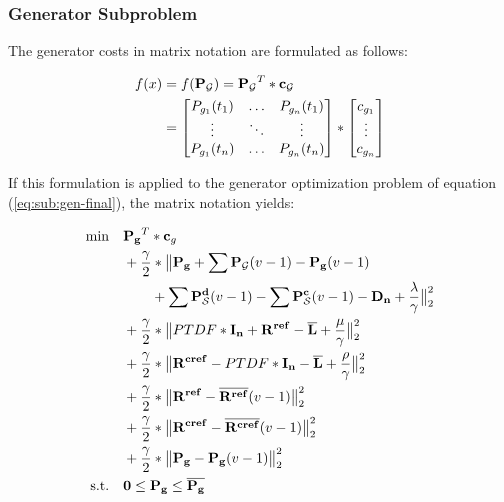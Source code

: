 \subsubsection*{Generator Subproblem}

The generator costs in matrix notation are formulated as follows:

\begin{subequations}
	\begin{align}
		f(x) &= f(\vb{P_\mathcal{G}}) = \vb{P_\mathcal{G}}^T * \vb{c_\mathcal{G}}\\
		& = \begin{bmatrix}
			P_{g_1}(t_1) & \dots & P_{g_n}(t_1) \\
			\vdots & \ddots & \vdots \\
			P_{g_1}(t_n) & \dots & P_{g_n}(t_n)
		\end{bmatrix} * \begin{bmatrix}
			c_{g_1} \\
			\vdots \\
			c_{g_n}
		\end{bmatrix}
	\end{align}
\end{subequations}

If this formulation is applied to the generator optimization problem of equation (\ref{eq:sub:gen-final}), the matrix notation yields:

 \begin{subequations}
	\begin{align}
		 \min \quad & \vb{P_g}^T * \vb{c}_g \\
		 & + \frac{\gamma}{2} * \big\| \vb{P_g} + \sum \vb{P_\mathcal{G}}(v-1) - \vb{P_g}(v-1) \nonumber \\
		 & \qquad + \sum \vb{P_\mathcal{S}^d}(v-1) - \sum \vb{P_\mathcal{S}^c}(v-1) - \vb{D_n} + \frac{\vb{\lambda}}{\gamma} \big\|^2_2 \label{eq:dom-matrix:eb} \\
		 & + \frac{\gamma}{2} * \big\| PTDF * \vb{I_n} + \vb{R^{ref}} - \vb{\overline{L}} + \frac{\vb{\mu}}{\gamma}\big\|^2_2 \nonumber \\
		 & + \frac{\gamma}{2} * \big\| \vb{R^{cref}} - PTDF * \vb{I_n} - \vb{\overline{L}} + \frac{\vb{\rho}}{\gamma}\big\|^2_2 \nonumber \\
		 & + \frac{\gamma}{2} * \big\| \vb{R^{ref}} - \vb{\overline{R^{ref}}}(v-1)  \big\|^2_2 \nonumber\\
		 & + \frac{\gamma}{2} * \big\| \vb{R^{cref}} - \vb{\overline{R^{cref}}}(v-1) \big\|^2_2 \nonumber \\
		 & + \frac{\gamma}{2} * \big\| \vb{P_g} - \vb{P_g}(v-1) \big\|^2_2 \nonumber \\
		 \text{s.t.} \quad & \vb{0} \leq \vb{P_g} \leq \vb{\overline{P_g}}
	\end{align}
\end{subequations}

